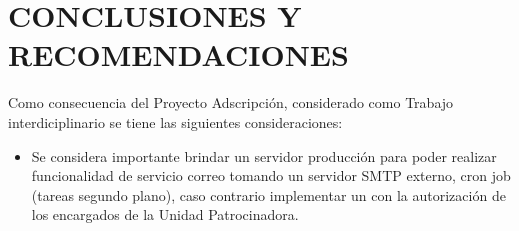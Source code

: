 \chapter{CONCLUSIONES Y RECOMENDACIONES}

Como consecuencia del Proyecto Adscripci\'{o}n, considerado como Trabajo 
interdiciplinario se tiene las siguientes consideraciones:

\begin{itemize}

\item Se considera importante brindar un servidor producci\'{o}n para poder 
realizar funcionalidad de servicio correo tomando un servidor SMTP externo,
cron job (tareas segundo plano), caso contrario implementar un con la 
autorizaci\'{o}n de los encargados de la Unidad Patrocinadora.


\end{itemize}